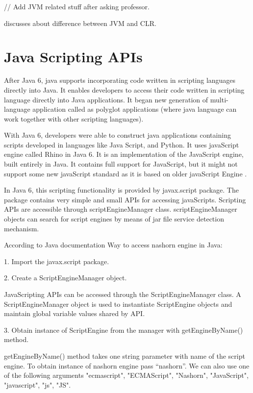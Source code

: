 // Add JVM related stuff after asking professor.

\cite{Singer:2003:JVC:957289.957341} discusses about difference between JVM and CLR.

\section{Java Scripting APIs}

After Java 6, java supports incorporating code written in scripting languages directly into Java. It enables developers to access their code written in scripting language directly into Java applications. It began new generation of multi-language application called as polyglot applications (where java language can work together with other scripting languages). \cite{Juneau2017}

With Java 6, developers were able to construct java applications containing scripts developed in languages like Java Script, and Python. It uses javaScript engine called Rhino in Java 6.  It is an implementation of the JavaScript engine, built entirely in Java. It contains full support for JavaScript, but it might not support some new javaScript standard as it is based on older javaScript Engine \cite{Juneau2017}.


In Java 6, this scripting functionality is provided by javax.script package. The package contains very simple and small APIs for accessing javaScripts. Scripting APIs are accessible through scriptEngineManager class. scriptEngineManager objects can search for script engines by means of jar file service detection mechanism.

According to Java documentation \cite{javascripting} Way to access nashorn engine in Java:

1.	Import the javax.script package.

2.	Create a ScriptEngineManager object.

JavaScripting APIs can be accessed through the ScriptEngineManager class. A ScriptEngineManager object is used to instantiate ScriptEngine objects and maintain global variable values shared by API. 

3.	Obtain instance of ScriptEngine from the manager with getEngineByName() method.

getEngineByName() method takes one string parameter with name of the script engine. To obtain instance of nashorn engine pass “nashorn”. We can also use one of the following arguments "ecmascript", "ECMAScript", "Nashorn", "JavaScript", "javascript", "js", "JS".
 
